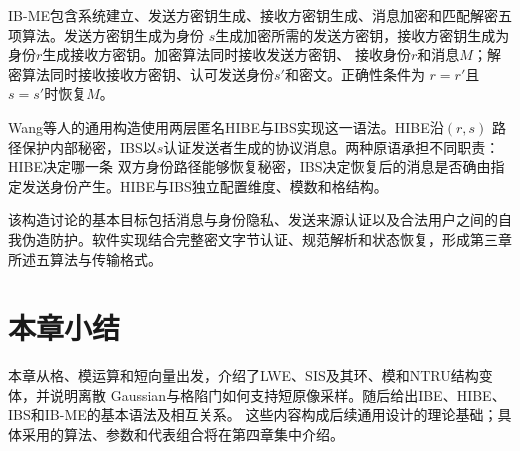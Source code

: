 IB-ME包含系统建立、发送方密钥生成、接收方密钥生成、消息加密和匹配解密五项算法。发送方密钥生成为身份
$s$生成加密所需的发送方密钥，接收方密钥生成为身份$r$生成接收方密钥。加密算法同时接收发送方密钥、
接收身份$r$和消息$M$；解密算法同时接收接收方密钥、认可发送身份$s'$和密文。正确性条件为
$r=r'$且$s=s'$时恢复$M$。

Wang等人的通用构造使用两层匿名HIBE与IBS实现这一语法\cite{wang2024ibme}。HIBE沿$(r,s)$
路径保护内部秘密，IBS以$s$认证发送者生成的协议消息。两种原语承担不同职责：HIBE决定哪一条
双方身份路径能够恢复秘密，IBS决定恢复后的消息是否确由指定发送身份产生。HIBE与IBS独立配置维度、模数和格结构。

该构造讨论的基本目标包括消息与身份隐私、发送来源认证以及合法用户之间的自我伪造防护。软件实现结合完整密文字节认证、规范解析和状态恢复，形成第三章所述五算法与传输格式。

\section{本章小结}

本章从格、模运算和短向量出发，介绍了LWE、SIS及其环、模和NTRU结构变体，并说明离散
Gaussian与格陷门如何支持短原像采样。随后给出IBE、HIBE、IBS和IB-ME的基本语法及相互关系。
这些内容构成后续通用设计的理论基础；具体采用的算法、参数和代表组合将在第四章集中介绍。
